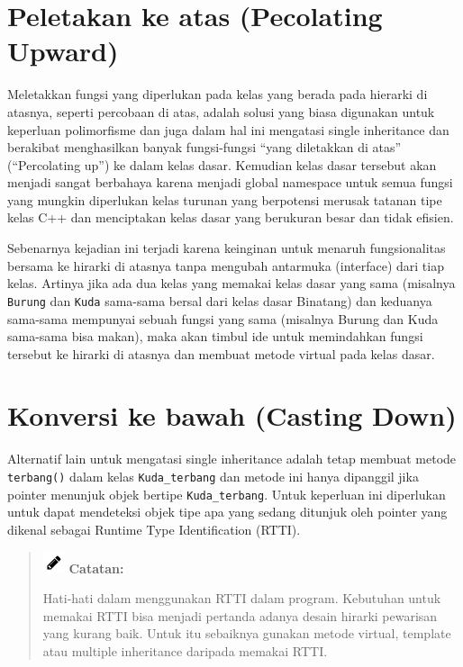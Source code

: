 \section{Peletakan ke atas (Pecolating
Upward)}\label{peletakan-ke-atas-pecolating-upward}

Meletakkan fungsi yang diperlukan pada kelas yang berada pada hierarki
di atasnya, seperti percobaan di atas, adalah solusi yang biasa
digunakan untuk keperluan polimorfisme dan juga dalam hal ini mengatasi
single inheritance dan berakibat menghasilkan banyak fungsi-fungsi
``yang diletakkan di atas'' (``Percolating up'') ke dalam kelas dasar.
Kemudian kelas dasar tersebut akan menjadi sangat berbahaya karena
menjadi global namespace untuk semua fungsi yang mungkin diperlukan
kelas turunan yang berpotensi merusak tatanan tipe kelas C++ dan
menciptakan kelas dasar yang berukuran besar dan tidak efisien.

Sebenarnya kejadian ini terjadi karena keinginan untuk menaruh
fungsionalitas bersama ke hirarki di atasnya tanpa mengubah antarmuka
(interface) dari tiap kelas. Artinya jika ada dua kelas yang memakai
kelas dasar yang sama (misalnya \texttt{Burung} dan \texttt{Kuda}
sama-sama bersal dari kelas dasar Binatang) dan keduanya sama-sama
mempunyai sebuah fungsi yang sama (misalnya Burung dan Kuda sama-sama
bisa makan), maka akan timbul ide untuk memindahkan fungsi tersebut ke
hirarki di atasnya dan membuat metode virtual pada kelas dasar.

\section{Konversi ke bawah (Casting
Down)}\label{konversi-ke-bawah-casting-down}

Alternatif lain untuk mengatasi single inheritance adalah tetap membuat
metode \texttt{terbang()} dalam kelas \texttt{Kuda\_terbang} dan metode
ini hanya dipanggil jika pointer menunjuk objek bertipe
\texttt{Kuda\_terbang}. Untuk keperluan ini diperlukan untuk dapat
mendeteksi objek tipe apa yang sedang ditunjuk oleh pointer yang dikenal
sebagai Runtime Type Identification (RTTI).
\begin{quotation}
	\includegraphics{../manuscript/images/pencil} \textbf{Catatan:}
	 
	 Hati-hati dalam menggunakan RTTI dalam program. Kebutuhan untuk memakai
	 RTTI bisa menjadi pertanda adanya desain hirarki pewarisan yang kurang
	 baik. Untuk itu sebaiknya gunakan metode virtual, template atau multiple
	 inheritance daripada memakai RTTI.
\end{quotation}


